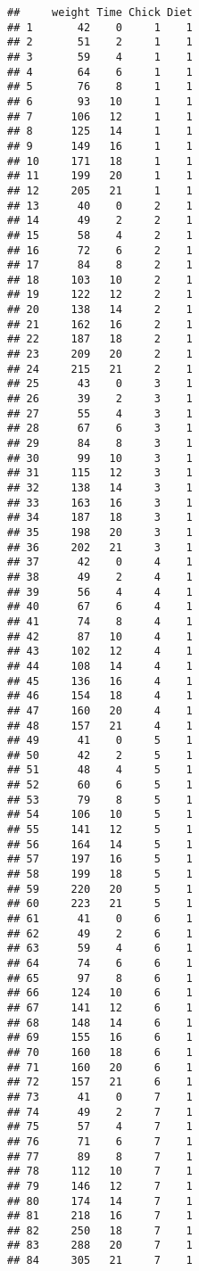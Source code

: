 \documentclass[
]{article}
\begin{document}
\begin{verbatim}
##     weight Time Chick Diet
## 1       42    0     1    1
## 2       51    2     1    1
## 3       59    4     1    1
## 4       64    6     1    1
## 5       76    8     1    1
## 6       93   10     1    1
## 7      106   12     1    1
## 8      125   14     1    1
## 9      149   16     1    1
## 10     171   18     1    1
## 11     199   20     1    1
## 12     205   21     1    1
## 13      40    0     2    1
## 14      49    2     2    1
## 15      58    4     2    1
## 16      72    6     2    1
## 17      84    8     2    1
## 18     103   10     2    1
## 19     122   12     2    1
## 20     138   14     2    1
## 21     162   16     2    1
## 22     187   18     2    1
## 23     209   20     2    1
## 24     215   21     2    1
## 25      43    0     3    1
## 26      39    2     3    1
## 27      55    4     3    1
## 28      67    6     3    1
## 29      84    8     3    1
## 30      99   10     3    1
## 31     115   12     3    1
## 32     138   14     3    1
## 33     163   16     3    1
## 34     187   18     3    1
## 35     198   20     3    1
## 36     202   21     3    1
## 37      42    0     4    1
## 38      49    2     4    1
## 39      56    4     4    1
## 40      67    6     4    1
## 41      74    8     4    1
## 42      87   10     4    1
## 43     102   12     4    1
## 44     108   14     4    1
## 45     136   16     4    1
## 46     154   18     4    1
## 47     160   20     4    1
## 48     157   21     4    1
## 49      41    0     5    1
## 50      42    2     5    1
## 51      48    4     5    1
## 52      60    6     5    1
## 53      79    8     5    1
## 54     106   10     5    1
## 55     141   12     5    1
## 56     164   14     5    1
## 57     197   16     5    1
## 58     199   18     5    1
## 59     220   20     5    1
## 60     223   21     5    1
## 61      41    0     6    1
## 62      49    2     6    1
## 63      59    4     6    1
## 64      74    6     6    1
## 65      97    8     6    1
## 66     124   10     6    1
## 67     141   12     6    1
## 68     148   14     6    1
## 69     155   16     6    1
## 70     160   18     6    1
## 71     160   20     6    1
## 72     157   21     6    1
## 73      41    0     7    1
## 74      49    2     7    1
## 75      57    4     7    1
## 76      71    6     7    1
## 77      89    8     7    1
## 78     112   10     7    1
## 79     146   12     7    1
## 80     174   14     7    1
## 81     218   16     7    1
## 82     250   18     7    1
## 83     288   20     7    1
## 84     305   21     7    1

\end{verbatim}
\end{document}

